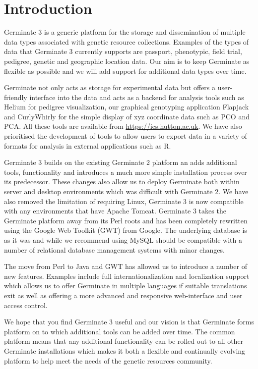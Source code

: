 \setcounter{page}{1}

\section{Introduction}
Germinate 3 is a generic platform for the storage and dissemination of multiple data types associated with genetic resource collections. Examples of the types of data that Germinate 3 currently supports are passport, phenotypic, field trial, pedigree, genetic and geographic location data. Our aim is to keep Germinate as flexible as possible and we will add support for additional data types over time.

Germinate not only acts as storage for experimental data but offers a user-friendly interface into the data and acts as a backend for analysis tools such as Helium for pedigree visualization, our graphical genotyping application Flapjack \cite{Flapjack} and CurlyWhirly for the simple display of xyz coordinate data such as PCO and PCA. All these tools are available from \url{https://ics.hutton.ac.uk}. We have also prioritised the development of tools to allow users to export data in a variety of formats for analysis in external applications such as R.

Germinate 3 builds on the existing Germinate 2 platform an adds additional tools, functionality and introduces a much more simple installation process over its predecessor. These changes also allow us to deploy Germinate both within server and desktop environments which was difficult with Germinate 2. We have also removed the limitation of requiring Linux, Germinate 3 is now compatible with any environments that have Apache Tomcat. Germinate 3 takes the Germinate platform away from its Perl roots and has been completely rewritten using the Google Web Toolkit (GWT) from Google. The underlying database is as it was and while we recommend using MySQL should be compatible with a number of relational database management systems with minor changes. 

The move from Perl to Java and GWT has allowed us to introduce a number of new features. Examples include full internationalization and localization support which allows us to offer Germinate in multiple languages if suitable translations exit as well as offering a more advanced and
responsive web-interface and user access control.

We hope that you find Germinate 3 useful and our vision is that Germinate forms platform on to which additional tools can be added over time. The common platform means that any additional functionality can be rolled out to all other Germinate installations which makes it both a flexible and continually evolving platform to help meet the needs of the genetic resources community.
 
